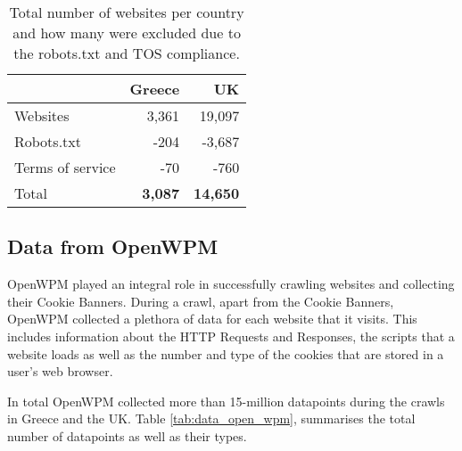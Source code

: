 \documentclass[../main.tex]{subfiles}
\begin{document}
\begin{table}[ht]
    \centering
    \begin{tabular}{@{}lrr@{}}
    \toprule
                     & Greece & UK              \\ \midrule
    Websites         & 3,361  & 19,097          \\
    Robots.txt       & -204   & -3,687          \\
    Terms of service & -70    & -760            \\
    Total            & \textbf{3,087}  & \textbf{14,650} \\ \bottomrule
    \end{tabular}
    \caption{Total number of websites per country and how many were excluded due to the robots.txt and TOS compliance.}
    \label{tab:data_websites}
\end{table}

\subsection{Data from OpenWPM}
OpenWPM played an integral role in successfully crawling websites and collecting their Cookie Banners. During a crawl, apart from the Cookie Banners, OpenWPM collected a plethora of data for each website that it visits. This includes information about the HTTP Requests and Responses, the scripts that a website loads as well as the number and type of the cookies that are stored in a user’s web browser.

In total OpenWPM collected more than 15-million datapoints during the crawls in Greece and the UK. Table \ref{tab:data_open_wpm}, summarises the total number of datapoints as well as their types. 
\end{document}
